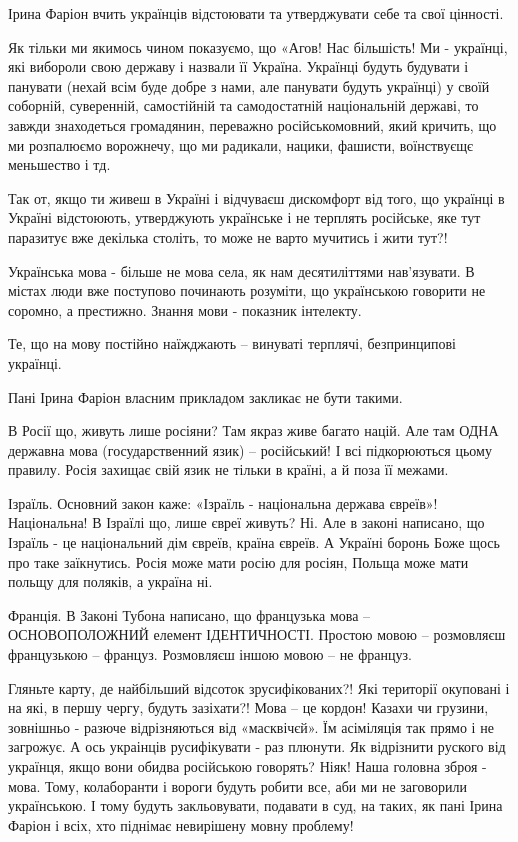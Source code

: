 Ірина Фаріон вчить українців відстоювати та утверджувати себе та свої цінності.

Як тільки ми якимось чином показуємо, що «Агов! Нас більшість! Ми - українці,
які вибороли свою державу і назвали її Україна. Українці будуть будувати і
панувати (нехай всім буде добре з нами, але панувати будуть українці) у своїй
соборній, суверенній, самостійній та самодостатній національній державі, то
завжди знаходеться громадянин, переважно російськомовний, який кричить, що ми
розпалюємо ворожнечу, що ми радикали, нацики, фашисти, воїнствуєщє меньшество і
тд.

Так от, якщо ти живеш в Україні і відчуваєш дискомфорт від того, що українці в
Україні відстоюють, утверджують українське і не терплять російське, яке тут
паразитує вже декілька століть, то може не варто мучитись і жити тут?! 

Українська мова - більше не мова села, як нам десятиліттями нав'язувати. В
містах люди вже поступово починають розуміти, що українською говорити не
соромно, а престижно. Знання мови - показник інтелекту.

Те, що на мову постійно наїжджають – винуваті терплячі, безпринципові українці. 

Пані Ірина Фаріон власним прикладом закликає не бути такими.

В Росії що, живуть лише росіяни? Там якраз живе багато націй. Але там  ОДНА
державна мова (государственний язик) – російський! І всі підкорюються цьому
правилу. Росія захищає свій язик не тільки в країні, а й поза її межами.

Ізраїль. Основний закон каже: «Ізраїль - національна держава євреїв»!
Національна! В Ізраїлі що, лише євреї живуть? Ні. Але в законі написано, що
Ізраїль - це національний дім євреїв, країна євреїв. А Україні боронь Боже щось
про таке заїкнутись. Росія може мати росію для росіян, Польща може мати польщу
для поляків, а україна ні.

Франція. В Законі Тубона написано, що французька мова – ОСНОВОПОЛОЖНИЙ елемент
ІДЕНТИЧНОСТІ. Простою мовою – розмовляєш французькою – француз. Розмовляєш
іншою мовою – не француз. 

Гляньте карту, де найбільший відсоток зрусифікованих?! Які території окуповані
і на які, в першу чергу, будуть зазіхати?! Мова – це кордон! Казахи чи грузини,
зовнішньо - разюче відрізняються від «масквічєй». Їм асіміляція так прямо і не
загрожує. А ось украінців русифікувати - раз плюнути. Як відрізнити руского від
українця, якщо вони обидва російською говорять? Ніяк! Наша головна зброя -
мова. Тому, колаборанти і вороги будуть робити все, аби ми не заговорили
українською. І тому будуть закльовувати, подавати в суд, на таких, як пані
Ірина Фаріон і всіх, хто піднімає невирішену мовну проблему!

